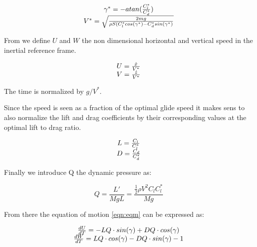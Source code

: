 \begin{equation}
	\begin{array}[c]{c}
		\gamma^*= - atan(\frac{C_l^*}{C_d^*}) \\
		V^* = \sqrt{\frac{2mg}{\rho S (C_l^* cos(\gamma^*) - C_d^* sin(\gamma^*)}}
	\end{array}
	\label{eqn:glide_speed}
\end{equation}

\par From we define $U$ and $W$ the non dimensional horizontal and vertical speed in the inertial reference frame.

\begin{equation}
	\begin{array}[c]{c}
		U = \frac{\dot{x}}{V^*} \\
		V= \frac{\dot{z}}{V^*}
	\end{array}
	\label{eqn:non_dim_speed}
\end{equation}

The time is normalized by $g / V^*$.

\par Since the speed is seen as a fraction of the optimal glide speed it makes sens to also normalize the lift and drag coefficients by their corresponding values at the optimal lift to drag ratio.

\begin{equation}
	\begin{array}[c]{c}
		L= \frac{C_l}{C_l^*} \\
		D= \frac{C_d}{C_d^*} 
	\end{array}
	\label{eqn:non_dim_coef}
\end{equation}

\par Finally we introduce Q the dynamic pressure as:

\begin{equation}
	Q = \frac{L'}{MgL} = \frac{\frac{1}{2} \rho V^2 C_l C_l^* }{Mg}
	\label{eqn:dynamic_pressure}
\end{equation}

\par From there the equation of motion \ref{eqn:eqm} can be expressed as:

\begin{equation}
\begin{array}[c]{c}
	\frac{dU}{dT}= -LQ \cdot sin(\gamma) + DQ \cdot cos(\gamma) \\ 
	\frac{dW}{dT}= LQ \cdot cos(\gamma) - DQ \cdot sin(\gamma) - 1
	\end{array}
	\label{eqn:non_dim_eqm}
\end{equation}

